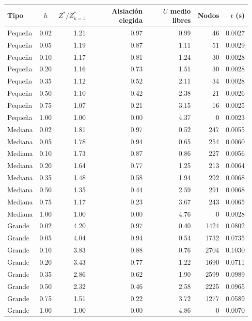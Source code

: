 \begin{tabular}{|l|c|r|r|r|r|r|}
\hline
\textbf{Tipo} & \textbf{$h$} & \textbf{$Z^*/Z^*_{h=1}$} & \textbf{Aislación elegida} & \textbf{$U$ medio libres} & \textbf{Nodos} & \textbf{$t$ (s)} \\ \hline
Pequeña & 0.02 & 1.21 & 0.97 & 0.99 & 46 & 0.0027 \\ \hline
Pequeña & 0.05 & 1.19 & 0.87 & 1.11 & 51 & 0.0029 \\ \hline
Pequeña & 0.10 & 1.17 & 0.81 & 1.24 & 30 & 0.0028 \\ \hline
Pequeña & 0.20 & 1.16 & 0.73 & 1.51 & 30 & 0.0028 \\ \hline
Pequeña & 0.35 & 1.12 & 0.52 & 2.11 & 34 & 0.0028 \\ \hline
Pequeña & 0.50 & 1.10 & 0.42 & 2.38 & 21 & 0.0026 \\ \hline
Pequeña & 0.75 & 1.07 & 0.21 & 3.15 & 16 & 0.0025 \\ \hline
Pequeña & 1.00 & 1.00 & 0.00 & 4.37 & 0 & 0.0023 \\ \hline
Mediana & 0.02 & 1.81 & 0.97 & 0.52 & 247 & 0.0055 \\ \hline
Mediana & 0.05 & 1.78 & 0.94 & 0.65 & 254 & 0.0060 \\ \hline
Mediana & 0.10 & 1.73 & 0.87 & 0.86 & 227 & 0.0056 \\ \hline
Mediana & 0.20 & 1.64 & 0.77 & 1.25 & 213 & 0.0064 \\ \hline
Mediana & 0.35 & 1.48 & 0.58 & 1.94 & 292 & 0.0068 \\ \hline
Mediana & 0.50 & 1.35 & 0.44 & 2.59 & 291 & 0.0068 \\ \hline
Mediana & 0.75 & 1.17 & 0.23 & 3.67 & 243 & 0.0065 \\ \hline
Mediana & 1.00 & 1.00 & 0.00 & 4.76 & 0 & 0.0028 \\ \hline
Grande & 0.02 & 4.20 & 0.97 & 0.40 & 1424 & 0.0802 \\ \hline
Grande & 0.05 & 4.04 & 0.94 & 0.54 & 1732 & 0.0735 \\ \hline
Grande & 0.10 & 3.83 & 0.88 & 0.76 & 2704 & 0.1030 \\ \hline
Grande & 0.20 & 3.43 & 0.77 & 1.22 & 1690 & 0.0711 \\ \hline
Grande & 0.35 & 2.86 & 0.62 & 1.90 & 2599 & 0.0989 \\ \hline
Grande & 0.50 & 2.32 & 0.46 & 2.58 & 2225 & 0.0965 \\ \hline
Grande & 0.75 & 1.51 & 0.22 & 3.72 & 1277 & 0.0589 \\ \hline
Grande & 1.00 & 1.00 & 0.00 & 4.86 & 0 & 0.0070 \\ \hline
\end{tabular}
